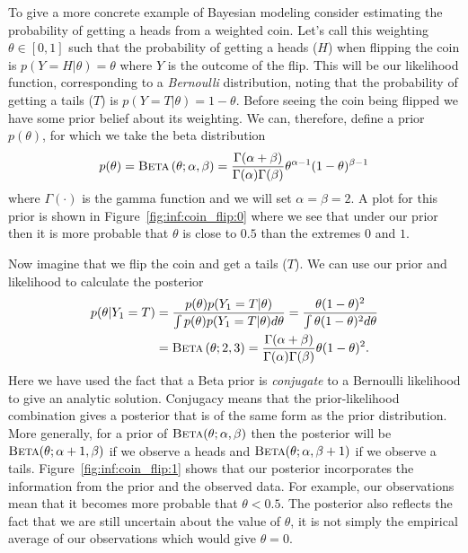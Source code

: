 To give a more concrete example of Bayesian modeling consider estimating
the probability of getting a heads from a weighted coin.  Let's call this weighting $\theta \in [0,1]$ such
that the probability of getting a heads  ($H$)  when flipping the coin is $p(Y=H | \theta)=\theta$
where $Y$ is the outcome of the flip.  This will be our likelihood function, corresponding to a
\emph{Bernoulli} distribution, noting that the probability
of getting a tails ($T$) is $p(Y = T | \theta) = 1-\theta$.
Before seeing the coin being flipped we have some prior belief about its weighting.  We
can, therefore, define a prior $p(\theta)$, for which we take the beta distribution
\begin{align}
\label{eq:bayes:beta}
p(\theta) = \textsc{Beta}\left(\theta ; \alpha,\beta\right) = \frac{\Gamma(\alpha+\beta)}{\Gamma (\alpha) \Gamma(\beta)}
\theta^{\alpha-1} (1-\theta)^{\beta-1}
\end{align}
where $\Gamma(\cdot)$ is the gamma function and we will set $\alpha=\beta=2$.  
A plot for this prior is shown in Figure~\ref{fig:inf:coin_flip:0}
where we see that under our prior then it is more probable that $\theta$ is close to $0.5$ than the
extremes $0$ and $1$.  

Now imagine that we flip the coin and get a tails ($T$).  We can
use our prior and likelihood to calculate the posterior
\begin{align}
p(\theta | Y_1 = T) &= \frac{p(\theta) p(Y_1=T | \theta)}{\int p(\theta) p(Y_1=T | \theta) d\theta} = \frac{\theta (1-\theta)^2}{\int \theta (1-\theta)^2 d\theta} \nonumber \\
&= \textsc{Beta}\left(\theta ; 2,3\right) = 
\frac{\Gamma(\alpha+\beta)}{\Gamma (\alpha) \Gamma(\beta)} \theta (1-\theta)^2 \label{eq:prob:beta_post_1}.
\end{align}
Here we have used the fact that a Beta prior is \emph{conjugate} to a Bernoulli likelihood
to give an analytic solution.  Conjugacy means that the prior-likelihood combination gives
a posterior that is of the same form as the prior distribution.  More generally, for a prior of
$\textsc{Beta}(\theta ; \alpha, \beta)$ then the posterior will be $\textsc{Beta}(\theta ; \alpha+1, \beta)$
if we observe a heads and $\textsc{Beta}(\theta ; \alpha, \beta+1)$ if we observe a tails.
Figure~\ref{fig:inf:coin_flip:1} shows that our
posterior incorporates the information from the prior and the observed data.  For example, our observations mean that it becomes more probable that $\theta<0.5$.  The posterior
also reflects the fact that we are still uncertain about the value of $\theta$, it is not simply the
empirical average of our observations which would give $\theta=0$.

